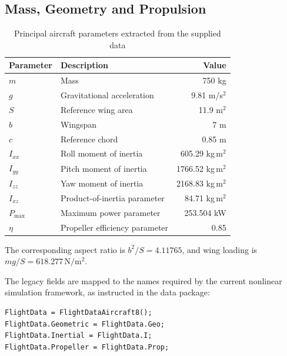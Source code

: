 \documentclass[a4paper,11pt]{article}
\begin{document}
\subsection{Mass, Geometry and Propulsion}
\begin{table}[H]\centering
\caption{Principal aircraft parameters extracted from the supplied data}
\begin{tabular}{llr}\toprule
Parameter&Description&Value\\\midrule
$m$&Mass&750 kg\\
$g$&Gravitational acceleration&9.81 m/s$^2$\\
$S$&Reference wing area&11.9 m$^2$\\
$b$&Wingspan&7 m\\
$c$&Reference chord&0.85 m\\
$I_{xx}$&Roll moment of inertia&605.29 kg\,m$^2$\\
$I_{yy}$&Pitch moment of inertia&1766.52 kg\,m$^2$\\
$I_{zz}$&Yaw moment of inertia&2168.83 kg\,m$^2$\\
$I_{xz}$&Product-of-inertia parameter&84.71 kg\,m$^2$\\
$P_{\max}$&Maximum power parameter&253.504 kW\\
$\eta$&Propeller efficiency parameter&0.85\\\bottomrule
\end{tabular}
\end{table}
The corresponding aspect ratio is $b^2/S=4.11765$, and wing loading is $mg/S=618.277\,\mathrm{N/m^2}$.

The legacy fields are mapped to the names required by the current nonlinear simulation framework, as instructed in the data package:
\begin{lstlisting}
FlightData = FlightDataAircraft8();
FlightData.Geometric = FlightData.Geo;
FlightData.Inertial = FlightData.I;
FlightData.Propeller = FlightData.Prop;
\end{lstlisting}
\end{document}
